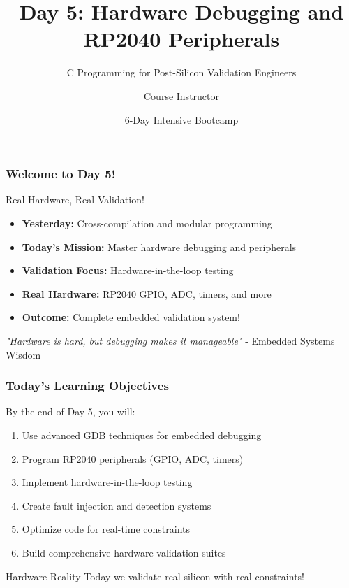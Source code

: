\documentclass{beamer}
\title{Day 5: Hardware Debugging and RP2040 Peripherals}
\subtitle{C Programming for Post-Silicon Validation Engineers}
\author{Course Instructor}
\date{6-Day Intensive Bootcamp}
\institute{Post-Silicon Validation Training Program}
\begin{document}
\frame{\titlepage}

\begin{frame}
\frametitle{Welcome to Day 5!}
\begin{center}
\Large Real Hardware, Real Validation!
\end{center}

\begin{itemize}
    \item \textbf{Yesterday:} Cross-compilation and modular programming
    \item \textbf{Today's Mission:} Master hardware debugging and peripherals
    \item \textbf{Validation Focus:} Hardware-in-the-loop testing
    \item \textbf{Real Hardware:} RP2040 GPIO, ADC, timers, and more
    \item \textbf{Outcome:} Complete embedded validation system!
\end{itemize}

\vspace{0.5cm}
\begin{center}
\textit{"Hardware is hard, but debugging makes it manageable"} - Embedded Systems Wisdom
\end{center}
\end{frame}

\begin{frame}
\frametitle{Today's Learning Objectives}
By the end of Day 5, you will:

\begin{enumerate}
    \item Use advanced GDB techniques for embedded debugging
    \item Program RP2040 peripherals (GPIO, ADC, timers)
    \item Implement hardware-in-the-loop testing
    \item Create fault injection and detection systems
    \item Optimize code for real-time constraints
    \item Build comprehensive hardware validation suites
\end{enumerate}

\vspace{0.5cm}
\begin{alertblock}{Hardware Reality}
Today we validate real silicon with real constraints!
\end{alertblock}
\end{frame}
\end{document}
